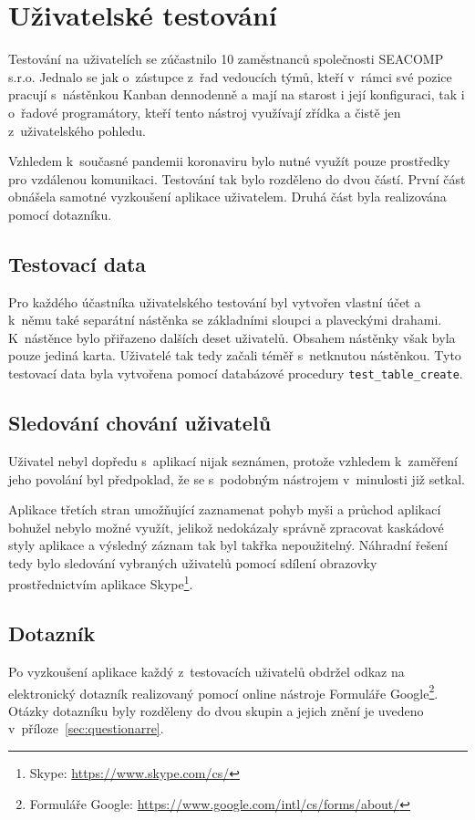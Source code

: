 \section{Uživatelské testování}
Testování na uživatelích se zúčastnilo 10 zaměstnanců společnosti SEACOMP s.r.o. Jednalo se jak o~zástupce z~řad vedoucích týmů, kteří v~rámci své pozice pracují s~nástěnkou Kanban dennodenně a mají na starost i její konfiguraci, tak i o~řadové programátory, kteří tento nástroj využívají zřídka a čistě jen z~uživatelského pohledu.

Vzhledem k~současné pandemii koronaviru bylo nutné využít pouze prostředky pro vzdálenou komunikaci. Testování tak bylo rozděleno do dvou částí. První část obnášela samotné vyzkoušení aplikace uživatelem. Druhá část byla realizována pomocí dotazníku.

\subsection{Testovací data}
Pro každého účastníka uživatelského testování byl vytvořen vlastní účet a k~němu také separátní nástěnka se základními sloupci a plaveckými drahami. K~nástěnce bylo přiřazeno dalších deset uživatelů. Obsahem nástěnky však byla pouze jediná karta. Uživatelé tak tedy začali téměř s~netknutou nástěnkou. Tyto testovací data byla vytvořena pomocí databázové procedury \texttt{test\_table\_create}.

\subsection{Sledování chování uživatelů}
Uživatel nebyl dopředu s~aplikací nijak seznámen, protože vzhledem k~zaměření jeho povolání byl předpoklad, že se s~podobným nástrojem v~minulosti již setkal. 

Aplikace třetích stran umožňující zaznamenat pohyb myši a průchod aplikací bohužel nebylo možné využít, jelikož nedokázaly správně zpracovat kaskádové styly aplikace a výsledný záznam tak byl takřka nepoužitelný. Náhradní řešení tedy bylo sledování vybraných uživatelů pomocí sdílení obrazovky prostřednictvím aplikace Skype\footnote{Skype: \url{https://www.skype.com/cs/}}.

\subsection{Dotazník}
Po vyzkoušení aplikace každý z~testovacích uživatelů obdržel odkaz na elektronický dotazník realizovaný pomocí online nástroje Formuláře Google\footnote{Formuláře Google: \url{https://www.google.com/intl/cs/forms/about/}}. Otázky dotazníku byly rozděleny do dvou skupin a jejich znění je uvedeno v~příloze~\ref{sec:questionarre}.

